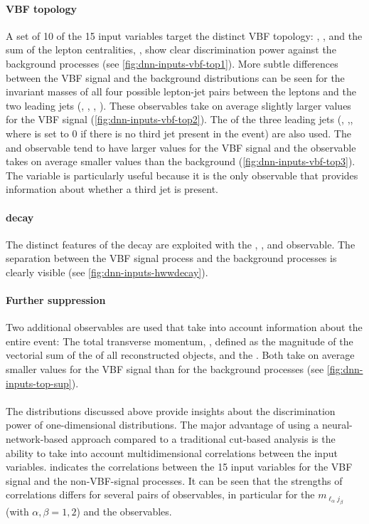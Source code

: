 \paragraph{VBF topology}
A set of 10 of the 15 input variables target the distinct VBF topology: \mjj, \dyjj, and the sum of the lepton centralities, \lepetacent, show clear discrimination power against the background processes (see \cref{fig:dnn-inputs-vbf-top1}). More subtle differences between the VBF signal and the background distributions can be seen for the invariant masses of all four possible lepton-jet pairs between the leptons and the two leading jets (\mlonejone, \mlonejtwo, \mltwojone, \mltwojtwo). These observables take on average slightly larger values for the VBF signal (\cref{fig:dnn-inputs-vbf-top2}). 
The \pT of the three leading jets (\pTjone, \pTjtwo,\pTjthree, where \pTjthree is set to 0 if there is no third jet present in the event) are also used. The \pTjone and \pTjtwo observable tend to have larger values for the VBF signal and the \pTjthree observable takes on average smaller values than the background (\cref{fig:dnn-inputs-vbf-top3}). The \pTjthree variable is particularly useful because it is the only observable that provides information about whether a third jet is present.

\paragraph{\HWW decay}
The distinct features of the \HWW decay are exploited with the \dphill, \mll, and \mT observable. 
The separation between the VBF signal process and the background processes is clearly visible (see \cref{fig:dnn-inputs-hwwdecay}). 

\paragraph{Further suppression}
Two additional observables are used that take into account information about the entire event:
The total transverse momentum, \pttot, defined as the magnitude of the vectorial sum of the \pT of all reconstructed objects, and the \METSig. Both take on average smaller values for the VBF signal than for the background processes (see \cref{fig:dnn-inputs-top-sup}).

\paragraph{}
The distributions discussed above provide insights about the discrimination power of one-dimensional distributions. The major advantage of using a neural-network-based approach compared to a traditional cut-based analysis is the ability to take into account multidimensional correlations between the input variables.  indicates the correlations between the 15 input variables for the VBF signal and the non-VBF-signal processes. It can be seen that the strengths of correlations differs for several pairs of observables, in particular for the $m_{\ell_\alpha j_\beta}$ (with $\alpha, \beta = 1, 2$) and the \pTjthree observables. 

